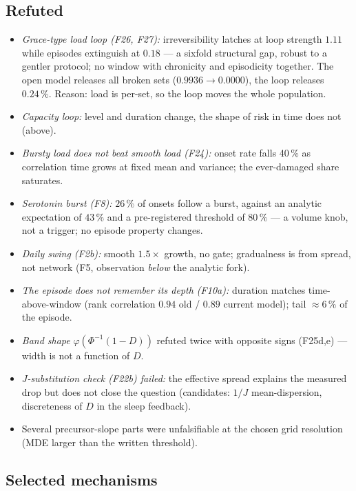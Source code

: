 \documentclass[11pt,a4paper]{article}
\theoremstyle{remark}
\begin{document}
\subsection{Refuted}\label{sec:failed}
\begin{itemize}
\item \emph{Grace-type load loop (F26, F27):} irreversibility latches at loop strength
$1.11$ while episodes extinguish at $0.18$ --- a sixfold structural gap, robust to a
gentler protocol; no window with chronicity and episodicity together. The open model
releases all broken sets ($0.9936\to0.0000$), the loop releases $0.24\,\%$. Reason:
load is per-set, so the loop moves the whole population.
\item \emph{Capacity loop:} level and duration change, the shape of risk in time does
not (above).
\item \emph{Bursty load does not beat smooth load (F24):} onset rate falls 40\,\% as
correlation time grows at fixed mean and variance; the ever-damaged share saturates.
\item \emph{Serotonin burst (F8):} $26\,\%$ of onsets follow a burst, against an analytic
expectation of $43\,\%$ and a pre-registered threshold of $80\,\%$ --- a volume knob, not a
trigger; no episode property changes.
\item \emph{Daily swing (F2b):} smooth $1.5\times$ growth, no gate; gradualness is from
spread, not network (F5, observation \emph{below} the analytic fork).
\item \emph{The episode does not remember its depth (F10a):} duration matches
time-above-window (rank correlation $0.94$ old / $0.89$ current model); tail
$\approx6\,\%$ of the episode.
\item \emph{Band shape} $\varphi(\Phi^{-1}(1-D))$ refuted twice with opposite signs
(F25d,e) --- width is not a function of $D$.
\item \emph{$J$-substitution check (F22b) failed:} the effective spread explains the
measured drop but does not close the question (candidates: $1/J$ mean-dispersion,
discreteness of $D$ in the sleep feedback).
\item Several precursor-slope parts were unfalsifiable at the chosen grid resolution
(MDE larger than the written threshold).
\end{itemize}

\subsection{Selected mechanisms}\label{sec:selected}
\end{document}
